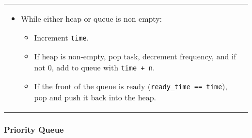 \begin{summary}
\begin{center}
\begin{tabular}{ll}
{\begin{itemize}
                    \item While either heap or queue is non-empty:
                    \begin{itemize}[noitemsep]
                        \item Increment \texttt{time}.
                        \item If heap is non-empty, pop task, decrement frequency, and if not 0, add to queue with \texttt{time + n}.
                        \item If the front of the queue is ready (\texttt{ready\_time == time}), pop and push it back into the heap.
                    \end{itemize}
                \end{itemize}
                } \\
        \end{tabular}
    \end{center}
\end{summary}


\subsubsection{Priority Queue}
\begin{algo}
    
\end{algo}